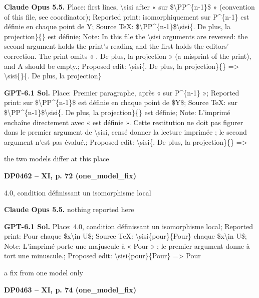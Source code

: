 \textbf{Claude Opus 5.5.} Place: first lines, \textbackslash{}sisi after « sur \$\textbackslash{}PP\textasciicircum{}\{n-1\}\$ » (convention of this file, see coordinator); Reported print: isomorphiquement sur P\textasciicircum{}\{n-1\} est définie en chaque point de Y; Source TeX: \$\textbackslash{}PP\textasciicircum{}\{n-1\}\$\textbackslash{}sisi\{. De plus, la projection\}\{\} est définie; Note: In this file the \textbackslash{}sisi arguments are reversed: the second argument holds the print's reading and the first holds the editors' correction. The print omits « . De plus, la projection » (a misprint of the print), and A should be empty.; Proposed edit: \textbackslash{}sisi\{. De plus, la projection\}\{\} =\allowbreak > \textbackslash{}sisi\{\}\{. De plus, la projection\}\par
\textbf{GPT-6.1 Sol.} Place: Premier paragraphe, après « sur P\textasciicircum{}\{n-1\} »; Reported print: sur \$\textbackslash{}PP\textasciicircum{}\{n-1\}\$ est définie en chaque point de \$Y\$; Source TeX: sur \$\textbackslash{}PP\textasciicircum{}\{n-1\}\$\textbackslash{}sisi\{. De plus, la projection\}\{\} est définie; Note: L'imprimé enchaîne directement avec « est définie ». Cette restitution ne doit pas figurer dans le premier argument de \textbackslash{}sisi, censé donner la lecture imprimée ; le second argument n'est pas évalué.; Proposed edit: \textbackslash{}sisi\{. De plus, la projection\}\{\} =\allowbreak > \par
the two models differ at this place\par
\par\noindent\hypertarget{DP0462}{}\textbf{DP0462 -- XI, p. 72 (one\_model\_fix)}\par
4.0, condition définissant un isomorphisme local\par
\textbf{Claude Opus 5.5.} nothing reported here\par
\textbf{GPT-6.1 Sol.} Place: 4.0, condition définissant un isomorphisme local; Reported print: Pour chaque \$x\textbackslash{}in U\$; Source TeX: \textbackslash{}sisi\{pour\}\{Pour\} chaque \$x\textbackslash{}in U\$; Note: L'imprimé porte une majuscule à « Pour » ; le premier argument donne à tort une minuscule.; Proposed edit: \textbackslash{}sisi\{pour\}\{Pour\} =\allowbreak > Pour\par
a fix from one model only\par
\par\noindent\hypertarget{DP0463}{}\textbf{DP0463 -- XI, p. 74 (one\_model\_fix)}\par
